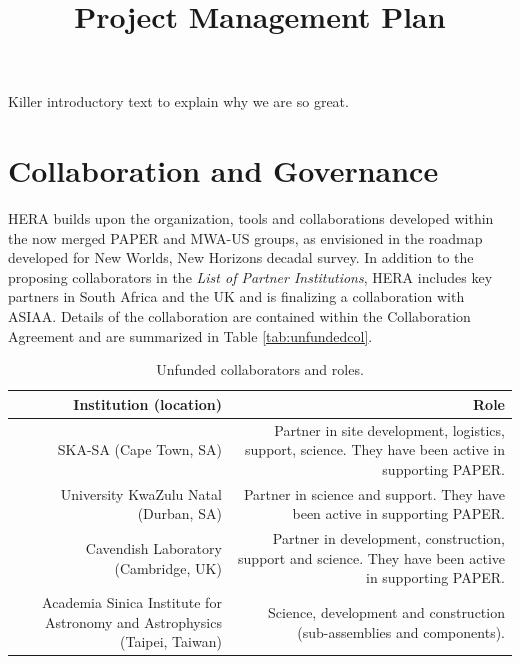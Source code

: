 \documentclass[preprint]{aastex}
\begin{document}
\title{Project Management Plan}


Killer introductory text to explain why we are so great.

\section{Collaboration and Governance}
HERA builds upon the organization, tools and collaborations developed within the now
merged PAPER and MWA-US groups, as envisioned in the roadmap developed for New
Worlds, New Horizons decadal survey. In addition to the proposing collaborators in
the {\em List of Partner Institutions}, HERA includes key partners in South Africa
and the UK and is finalizing a collaboration with ASIAA.  Details of the collaboration are 
contained within the Collaboration Agreement and are summarized in Table \ref{tab:unfundedcol}.
\begin{table}[h]
\caption{Unfunded collaborators and roles.}
\label{tab:unfundedcol}
\begin{tabular}{| r{} | r{} |}\hline
\textbf{Institution (location)} & \textbf{Role} \tabularnewline \hline
SKA-SA (Cape Town, SA) & Partner in site development, logistics, support, science. They have been active in supporting PAPER.\tabularnewline \hline
University KwaZulu Natal (Durban, SA) & Partner in science and support. They have been active in supporting PAPER.\tabularnewline \hline
Cavendish Laboratory (Cambridge, UK) & Partner in development, construction, support and science.  They have been active in supporting PAPER. \tabularnewline \hline
Academia Sinica Institute for Astronomy and Astrophysics (Taipei, Taiwan) & Science, development and construction (sub-assemblies and components). \tabularnewline \hline
\end{tabular}
\label{tab:otherpartners}
\end{table}
\end{document}
